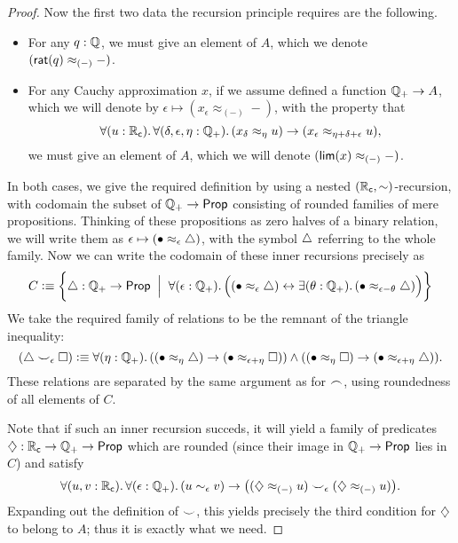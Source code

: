 \begin{proof}
  Now the first two data the recursion principle requires are the following.
  \begin{itemize}
  \item For any $q:\mathbb{Q}$, we must give an element of $A$, which we denote $(\mathsf{rat}(q)\approx_{(-)} -)$.
  \item For any Cauchy approximation $x$, if we assume defined a function $\mathbb{Q}_{+} \to A$, which we will denote by $\epsilon \mapsto (x_\epsilon \approx_{(-)} -)$, with the property that 
    \begin{equation}
      \fall{u:\RC}{\delta,\epsilon,\eta:\Qp} (x_\delta \approx_\eta u) \to (x_\epsilon \approx_{\eta+\delta+\epsilon} u),\label{eq:appxrec2}
    \end{equation}
    we must give an element of $A$, which we will denote $(\mathsf{lim}(x)\approx_{(-)} -)$.
  \end{itemize}
  In both cases, we give the required definition by using a nested $(\mathbb{R}_\mathsf{c},\sim)$-recursion, with codomain the subset of $\mathbb{Q}_{+}\to\mathsf{Prop}$ consisting of rounded families of mere propositions.
  Thinking of these propositions as zero halves of a binary relation, we will write them as $\epsilon \mapsto (\bullet\approx_{\epsilon}\triangle)$, with the symbol $\triangle$ referring to the whole family.
  Now we can write the codomain of these inner recursions precisely as
  \begin{equation*}
    C \defeq \bigg\{ \tapname :\Qp\to\prop \;\;\Big|\;\;
    \fall{\epsilon:\Qp} \Big((\tap\epsilon) \leftrightarrow \exis{\theta:\Qp} (\tap{\epsilon-\theta})\Big)\bigg\}
  \end{equation*}
  We take the required family of relations to be the remnant of the triangle inequality:
  \begin{equation*}
    (\tapname \bbsim_\epsilon \tapbname) \defeq
    \fall{\eta:\Qp} ((\tap\eta) \to (\tapb{\epsilon+\eta})) \land ((\tapb\eta) \to (\tap{\epsilon+\eta})).
  \end{equation*}
  These relations are separated by the same argument as for $\frown$, using roundedness of all elements of $C$.

  Note that if such an inner recursion succeds, it will yield a family of predicates $\diamondsuit : \mathbb{R}_\mathsf{c}\to\mathbb{Q}_{+}\to \mathsf{Prop}$ which are rounded (since their image in $\mathbb{Q}_{+}\to\mathsf{Prop}$ lies in $C$) and satisfy
  \[ \fall{u,v:\RC}{\epsilon:\Qp} (u\sim_\epsilon v) \to \big((\hapx_{(-)} u) \bbsim_\epsilon (\hapx_{(-)} u)\big). \]
  Expanding out the definition of $\smile$, this yields precisely the third condition for $\diamondsuit$ to belong to $A$; thus it is exactly what we need.


\end{proof}
